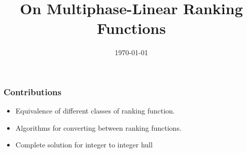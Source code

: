 \documentclass[11pt]{beamer}
\title{On Multiphase-Linear Ranking Functions}
\date{\today}
\begin{document}
\maketitle

\begin{frame}\frametitle{Contributions}
\begin{itemize}
\item Equivalence of different classes of ranking function.

\item Algorithms for converting between ranking functions.

\item Complete solution for integer to integer hull


\end{itemize}
\end{frame}
\end{document}
